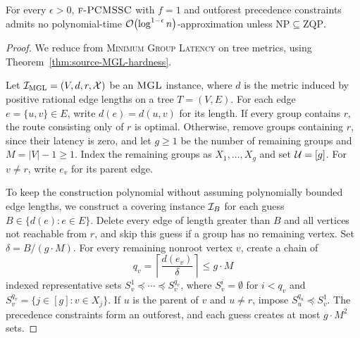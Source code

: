 \begin{theorem}\label{thm:PCMSSC-outforest-full-cover-hardness}
    For every $\epsilon>0$, $\textup{\textsc{f-PCMSSC}}$ with $f=1$ and outforest precedence constraints admits no polynomial-time $\mathcal{O}\mathopen{}\left( \log^{1-\epsilon} n \right)$-approximation unless $\mathrm{NP}\subseteq\mathrm{ZQP}$.
\end{theorem}
\begin{proof}
    We reduce from \textup{\textsc{Minimum Group Latency}} on tree metrics, using Theorem~\ref{thm:source-MGL-hardness}.

    Let $\mathcal{I}_{\mathrm{MGL}}=(V,d,r,\mathcal{X})$ be an $\textup{\textsc{MGL}}$ instance, where $d$ is the metric induced by positive rational edge lengths on a tree $T=(V,E)$. For each edge $e=\{u,v\}\in E$, write $d(e)=d(u,v)$ for its length. If every group contains $r$, the route consisting only of $r$ is optimal. Otherwise, remove groups containing $r$, since their latency is zero, and let $g\geq1$ be the number of remaining groups and $M=|V|-1\geq1$. Index the remaining groups as $X_1,\ldots,X_g$ and set $\mathcal{U}=[g]$. For $v\neq r$, write $e_v$ for its parent edge.

    To keep the construction polynomial without assuming polynomially bounded edge lengths, we construct a covering instance $\mathcal{I}_B$ for each guess $B\in\{d(e)\colon e\in E\}$. Delete every edge of length greater than $B$ and all vertices not reachable from $r$, and skip this guess if a group has no remaining vertex. Set $\delta=B/(g\cdot M)$. For every remaining nonroot vertex $v$, create a chain of
    \[
        q_v=\left\lceil\frac{d(e_v)}{\delta}\right\rceil\leq g\cdot M
    \]
    indexed representative sets $S_v^1\preceq\cdots\preceq S_v^{q_v}$, where $S_v^i=\emptyset$ for $i<q_v$ and $S_v^{q_v}=\{j\in[g]\colon v\in X_j\}$. If $u$ is the parent of $v$ and $u\neq r$, impose $S_u^{q_u}\preceq S_v^1$. The precedence constraints form an outforest, and each guess creates at most $g\cdot M^2$ sets.


\end{proof}
